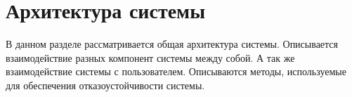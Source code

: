 \section{Архитектура системы}
\begin{annotation}
	В данном разделе рассматривается общая архитектура системы.
	Описывается взаимодействие разных компонент системы между собой.
	А так же взаимодействие системы с пользователем.
	Описываются методы, используемые для обеспечения отказоустойчивости системы.
\end{annotation}







